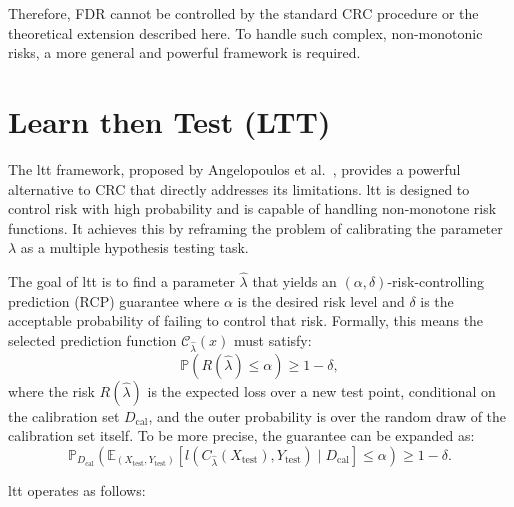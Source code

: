 Therefore, FDR cannot be controlled by the standard CRC procedure
or the theoretical extension described here.
To handle such complex, non-monotonic risks,
a more general and powerful framework is required.

\section{Learn then Test (LTT)}

The \gls{ltt} framework, proposed by Angelopoulos et al.~\cite{angelopoulos2022ltt},
provides a powerful alternative to CRC that directly addresses its limitations.
\gls{ltt} is designed to control risk with high probability
and is capable of handling non-monotone risk functions.
It achieves this by reframing the problem of calibrating the parameter \(\lambda\)
as a multiple hypothesis testing task.

The goal of \gls{ltt} is to find a parameter \(\hat{\lambda}\) that yields an
\((\alpha, \delta)\)-risk-controlling prediction (RCP) guarantee
where \(\alpha\) is the desired risk level and \(\delta\) is the acceptable probability
of failing to control that risk.
Formally, this means the selected prediction function
\(\mathcal{C}_{\hat{\lambda}}(x)\) must satisfy:
\[
    \mathbb{P} (R(\hat{\lambda}) \leq \alpha) \geq 1 - \delta,
\]
where the risk \(R(\hat{\lambda})\) is the expected loss over a new test point,
conditional on the calibration set \(D_{\text{cal}}\),
and the outer probability is over the random draw of the calibration set itself.
To be more precise, the guarantee can be expanded as:
\begin{equation}
    \mathbb{P}_{D_{\text{cal}}} \left( \mathbb{E}_{(X_{\text{test}}, Y_{\text{test}})}
    \left[ l(C_{\hat{\lambda}}(X_{\text{test}}), Y_{\text{test}}) \mid D_{\text{cal}} \right]
    \leq \alpha \right) \geq 1 - \delta.
\end{equation}

\gls{ltt} operates as follows:


